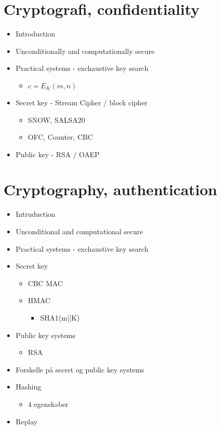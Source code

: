 \documentclass[paper=a4, fontsize=11pt]{scrartcl} %
\numberwithin{equation}{section} %
\numberwithin{figure}{section} %
\numberwithin{table}{section} %
\begin{document}
	
	\section{Cryptografi, confidentiality}
	
	\begin{itemize}
		\item Introduction
		\item Unconditionally and computationally secure
		\item Practical systems - exchaustive key search
		\begin{itemize}
			\item $c = E_K(m,n)$
		\end{itemize}
		\item Secret key - Stream Cipher / block cipher
		\begin{itemize}
			\item SNOW, SALSA20
			\item OFC, Counter, CBC
		\end{itemize}
		\item Public key - RSA / OAEP
	\end{itemize}
	
	\section{Cryptography, authentication}
	
	\begin{itemize}
		\item Intruduction
		\item Unconditional and computational secure
		\item Practical systems - exchaustive key search
		\item Secret key
		\begin{itemize}
			\item CBC MAC
			\item HMAC
			\begin{itemize}
				\item SHA1(m||K)
			\end{itemize}
		\end{itemize}
		\item Public key systems
		\begin{itemize}
			\item RSA
		\end{itemize}
		\item Forskelle på secret og public key systems
		\item Hashing
		\begin{itemize}
			\item 4 egenskaber
		\end{itemize}
		\item Replay
	\end{itemize}
	
\end{document}
